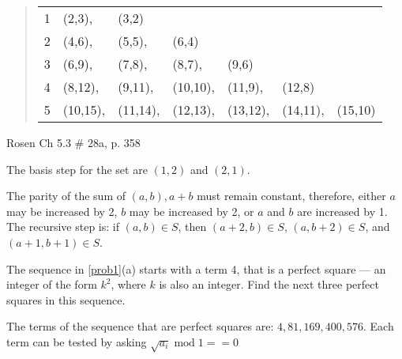 \documentclass[12pt,addpoints]{exam}
\begin{document}
\begin{questions}
\begin{solution}
\begin{quote}
    \begin{tabular}{rllllll}
    1 & (2,3), & (3,2) \\
    2 & (4,6), & (5,5), & (6,4) \\
    3 & (6,9), & (7,8), & (8,7), & (9,6) \\
    4 & (8,12), & (9,11), & (10,10), & (11,9), & (12,8) \\
    5 & (10,15), & (11,14), & (12,13), & (13,12), & (14,11), & (15,10) \\
    \end{tabular}
\end{quote}
\end{solution}


\question[5] Rosen Ch 5.3 \# 28a, p. 358
    \ifprintanswers
        \vspace{-10pt}
   \fi
\begin{solution}
	The basis step for the set are $(1,2)$ and $(2,1)$.  
	
	The parity of the sum of $(a,b), a + b$ must remain constant, therefore, either $a$ may be increased by 2, $b$ may be increased by 2, or $a$ and $b$ are increased by 1.  The recursive step is: if $(a,b) \in S$, then $(a+2,b) \in S$, $(a,b+2) \in S$, and $(a+1,b+1)\in S$.
\end{solution}


\bonusquestion[3] The sequence in \ref{prob1}(a) starts with a term 4, that is a perfect square --- an integer of the form $k^2$, where $k$ is also an integer.  Find the next three perfect squares in this sequence.
    \ifprintanswers
        \vspace{-10pt}
   \fi
\begin{solution}
	The terms of the sequence that are perfect squares are: $4, 81, 169, 400, 576$.
	Each term can be tested by asking $\sqrt{a_i} \; \text{mod}\; 1 == 0$
\end{solution}



\end{questions}
\end{document}
